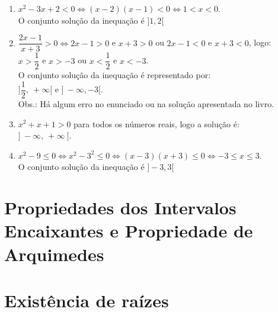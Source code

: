 \begin{enumerate}
	\begin{enumerate}
		\item %
		$x^2-3x+2<0 \Leftrightarrow (x-2)(x-1)<0 \Leftrightarrow 1 < x < 0$.\\
		O conjunto solução da inequação é $]1,2[$
		\item %
		$\dfrac{2x-1}{x+3} >0 \Leftrightarrow 2x-1 > 0$ e $x +3 > 0$ ou $2x-1<0$ e $x+3<0$, logo:\\
		$x>\dfrac{1}{2}$ e $x > -3$ ou $x<\dfrac{1}{2}$ e $x < -3$.\\
		O conjunto solução da inequação é representado por:\\
		$]\dfrac{1}{2},\ +\infty [$ e $]\ -\infty, -3[$.\\
		Obs.: Há algum erro no enunciado ou na solução apresentada no livro.
		\item %
		$x^2+x+1>0$ para todos os números reais, logo a solução é:\\ $]\ -\infty,\ +\infty\ [$.
		\item %
		$x^2-9\leq 0 \Leftrightarrow x^2-3^2 \leq 0 \Leftrightarrow (x-3)(x+3) \leq 0 \Leftrightarrow -3 \leq x \leq 3$.\\
		O conjunto solução da inequação é $]-3,3[$		
	\end{enumerate}
\end{enumerate}

\section{Propriedades dos Intervalos Encaixantes e Propriedade de Arquimedes}
\section{Existência de raízes}